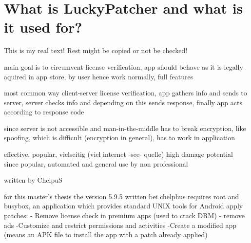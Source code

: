 \section{What is LuckyPatcher and what is it used for?} \label{section:luckypatcher-explain}
This is my real text! Rest might be copied or not be checked!

%
main goal is to circumvent license verification, app should behave as it is legally aquired in app store, by user hence work normally, full features

most common way client-server license verification, app gathers info and sends to server, server checks info and depending on this sends response, finally app acts according to response code

since server is not accessible and man-in-the-middle has to break encryption, like spoofing, which is difficult (encryption in general), has to work in application

effective, popular, vielseitig (viel internet -see- quelle)
high damage potential since popular, automated and general use by non professional

\cite{munteanLicense}
%

written by ChelpuS

for this master's thesis the version 5.9.5
written bei chelphus
requires root and busybox, an application which provides standard UNIX tools for Android\cite{busyboxApp}
apply patches:
- Remove license check in premium apps (used to crack DRM)
- remove ads
-Customize and restrict permissions and activities
-Create a modified app (means an APK file to install the app with a patch already applied)

